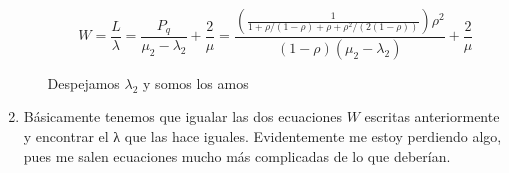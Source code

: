 \begin{problem}[18]
\begin{enumerate}
\begin{itemize}
\[W=\frac{L}{λ}=\frac{P_q}{μ_2-λ_2}+\frac{2}{μ}=\frac{\left(\frac{1}{1+ρ/(1-ρ)+ρ+ρ^2/(2(1-ρ))}\right)ρ^2}{(1-ρ)(μ_2-λ_2)}+\frac{2}{μ}\]

Despejamos $λ_2$ y somos los amos
\end{itemize}

\item

Básicamente tenemos que igualar las dos ecuaciones $W$ escritas anteriormente y encontrar el λ que las hace iguales. Evidentemente me estoy perdiendo algo, pues me salen ecuaciones mucho más complicadas de lo que deberían.
\end{enumerate}



\end{problem}

